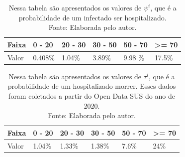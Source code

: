 \begin{table}[H]
  \centering
  \begin{tabular}{llllll}
  Faixa & 0 - 20 & 20 - 30 & 30 - 50 & 50 - 70 & \textgreater{}= 70 \\
  \hline
  Valor & 0.408\% & 1.04\%  & 3.89\% & 9.98
  \%& 17.5\%
  \end{tabular}

  \caption{Nessa tabela são apresentados os valores de $\psi^i$, que é a probabilidade de um infectado ser hospitalizado. \\Fonte: Elaborada pelo autor.}

  \label{psi}

\end{table}

\begin{table}[H]
  \centering
  \begin{tabular}{llllll}
  Faixa & 0 - 20 & 20 - 30 & 30 - 50 & 50 - 70 & \textgreater{}= 70 \\
  \hline
  Valor & 1.04\% & 1.33\%  & 1.38\% & 7.6\%  & 24\%            
  \end{tabular}

  \caption{Nessa tabela são apresentados os valores de $\tau^i$, que é a probabilidade de um hospitalizado morrer. Esses dados foram coletados a partir do Open Data SUS do ano de 2020. \\Fonte: Elaborada pelo autor.}

  \label{tau}

\end{table}